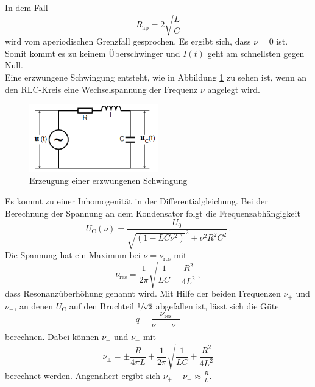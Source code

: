 In dem Fall 
\begin{equation}
    R_\text{ap}=2 \sqrt{\frac{L}{C}}
    \label{eqn:apbed}
\end{equation}
wird vom aperiodischen Grenzfall gesprochen. Es ergibt sich, dass $\nu = 0$ ist. Somit kommt es zu keinem Überschwinger und $I(t)$ geht am schnellsten gegen Null.\\
Eine erzwungene Schwingung entsteht, wie in Abbildung \ref{fig:erzw} zu sehen ist, wenn an den RLC-Kreis eine Wechselspannung der Frequenz $\nu$ angelegt wird.
\begin{figure}
    \centering
    \caption{Erzeugung einer erzwungenen Schwingung \cite{v354}} 
    \label{fig:erzw}
    \includegraphics[width = 0.5\textwidth]{pics/Erzwungen.png}
\end{figure}
Es kommt zu einer Inhomogenität in der 
Differentialgleichung. Bei der Berechnung der Spannung an dem Kondensator folgt die Frequenzabhängigkeit
\begin{equation}
    U_\text{C}(\nu)= \frac{U_0}{\sqrt{\left(1-LC\nu^2\right)}^2 + \nu^2 R^2 C^2} \, .
    \label{eqn:frqnzabhängi}
\end{equation}
Die Spannung hat ein Maximum bei $\nu=\nu_\text{res}$ mit 
\begin{equation}
    \nu_\text{res}= \frac{1}{2 \pi} \sqrt{\frac{1}{L C} - \frac{R^2}{4 L^2}} \, ,
    \label{eqn:omgres}
\end{equation}
dass Resonanzüberhöhung genannt wird. Mit Hilfe der beiden Frequenzen $\nu_+$ und $\nu_-$, an denen $U_\text{C}$ auf den Bruchteil $\sfrac{1}{\sqrt{2}}$
abgefallen ist, lässt sich die Güte 
\begin{equation}
    q=\frac{\nu_\text{res}}{\nu_+ - \nu_-}
    \label{eqn:güte}
\end{equation}
berechnen. Dabei können $\nu_+$ und $\nu_-$ mit
\begin{equation}
    \nu_\pm= \pm \frac{R}{4 \pi L} + \frac{1}{2\pi} \sqrt{\frac{1}{L C} + \frac{R^2}{4 L^2}}
    \label{eqn:omgapm}
\end{equation}
berechnet werden.
Angenähert ergibt sich $\nu_+ - \nu_- \approx \frac{R}{L}$.